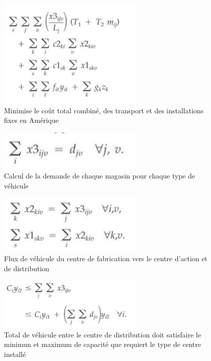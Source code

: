 \documentclass{ceri}
\begin{document}
\bigskip
\bigskip
\bigskip
\bigskip
\bigskip
\begin{figure}
\centering
\includegraphics[width=7cm]{t1.png}
\caption{\label{fig:t1}Minimise le coût total combiné, des transport et des installations fixes en Amérique}
\end{figure}

\begin{figure}
\centering
\includegraphics[width=7cm]{t2.png}
\caption{\label{fig:t2}Calcul de la demande de chaque magasin pour chaque type de véhicule}
\end{figure}

\begin{figure}
\centering
\includegraphics[width=7cm]{t3.png}
\caption{\label{fig:t3}Flux de véhicule du centre de fabrication vers le centre d'action et de distribution}
\end{figure}

\begin{figure}
\centering
\includegraphics[width=7cm]{t4.png}
\caption{\label{fig:t4}Total de véhicule entre le centre de distribution doit satisfaire le minimun et maximum de capacité que requiert le type de centre installé}
\end{figure}
\end{document}
